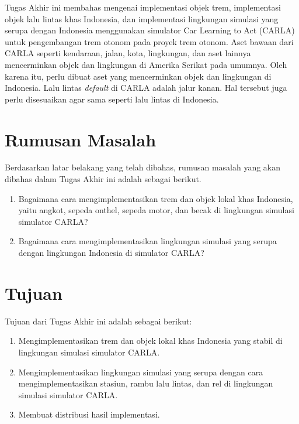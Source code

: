 Tugas Akhir ini membahas mengenai implementasi objek trem, implementasi objek
lalu lintas khas Indonesia, dan implementasi lingkungan simulasi yang serupa
dengan Indonesia menggunakan simulator Car Learning to Act (CARLA) untuk
pengembangan trem otonom pada proyek trem otonom. Aset bawaan dari CARLA seperti
kendaraan, jalan, kota, lingkungan, dan aset lainnya mencerminkan objek dan
lingkungan di Amerika Serikat pada umumnya. Oleh karena itu, perlu dibuat aset
yang mencerminkan objek dan lingkungan di Indonesia. Lalu lintas
\textit{default} di CARLA adalah jalur kanan. Hal tersebut juga perlu
disesuaikan agar sama seperti lalu lintas di Indonesia.

\section{Rumusan Masalah}

Berdasarkan latar belakang yang telah dibahas, rumusan masalah yang akan dibahas
dalam Tugas Akhir ini adalah sebagai berikut.

\begin{enumerate}

    \item Bagaimana cara mengimplementasikan trem dan objek lokal khas
    Indonesia, yaitu angkot, sepeda onthel, sepeda motor, dan becak
    di lingkungan simulasi simulator CARLA?

    \item Bagaimana cara mengimplementasikan lingkungan simulasi yang serupa
    dengan lingkungan Indonesia di simulator CARLA?



\end{enumerate}

\section{Tujuan}

Tujuan dari Tugas Akhir ini adalah sebagai berikut:

\begin{enumerate}

    \item Mengimplementasikan trem dan objek lokal khas Indonesia yang stabil di
    lingkungan simulasi simulator CARLA.

    \item Mengimplementasikan lingkungan simulasi yang serupa dengan cara
    mengimplementasikan stasiun, rambu lalu lintas, dan rel di lingkungan
    simulasi simulator CARLA.

    \item Membuat distribusi hasil implementasi.

\end{enumerate}

